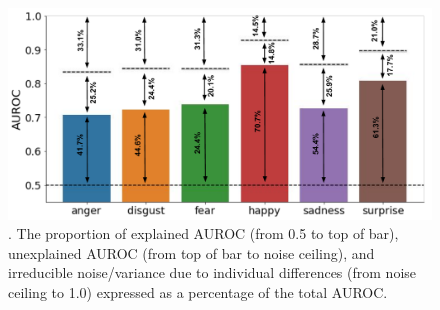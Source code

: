 \documentclass[11pt,american,a4paper,oneside,]{memoir} %
\begin{document}
\begin{figure}
\centering
\includegraphics{_bookdown_files/hypothesis-kernel-analysis-files/figures/figure_S6.pdf}
\caption{\label{fig:fig-hka-S6}. The proportion of explained AUROC (from 0.5 to top of bar), unexplained AUROC (from top of bar to noise ceiling), and irreducible noise/variance due to individual differences (from noise ceiling to 1.0) expressed as a percentage of the total AUROC.}
\end{figure}



\begingroup\fontsize{8}{10}\selectfont
\end{document}

